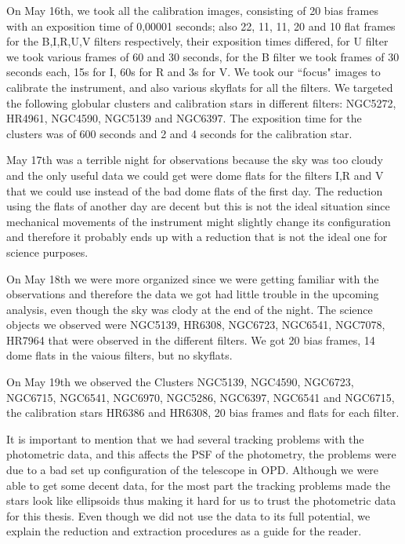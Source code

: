 On May 16th, we took all the calibration images, consisting of 20 bias frames with an exposition time of 0,00001 seconds; also 22, 11, 11, 20 and 10 flat frames for the B,I,R,U,V filters respectively, their exposition times differed, for  U filter we took various frames of 60 and 30 seconds, for the B filter we took frames of 30 seconds each, 15s for I, 60s for R and 3s for V. We took our ``focus" images to calibrate the instrument, and also various skyflats for all the filters. We targeted the following globular clusters and calibration stars in different filters: NGC5272, HR4961, NGC4590, NGC5139 and NGC6397. The exposition time for the clusters was of 600 seconds and 2 and 4 seconds for the calibration star. 

May 17th was a terrible night for observations because the sky was too cloudy and the only useful data we could get were dome flats for the filters I,R and V that we could use instead of the bad dome flats of the first day. The reduction using the flats of another day are decent but this is not the ideal situation since mechanical movements of the instrument might slightly change its configuration and therefore it probably ends up with a reduction that is not the ideal one for science purposes.  

On May 18th we were more organized since we were getting familiar with the observations and therefore the data we got had little trouble in the upcoming analysis, even though the sky was clody at the end of the night. The science objects we observed were NGC5139, HR6308, NGC6723, NGC6541, NGC7078, HR7964 that were observed in the different filters. We got 20 bias frames, 14 dome flats in the vaious filters, but no skyflats. 

On May 19th we observed the Clusters NGC5139, NGC4590, NGC6723, NGC6715, NGC6541, NGC6970, NGC5286,    NGC6397, NGC6541 and NGC6715, the calibration stars HR6386 and HR6308, 20 bias frames and flats for each filter.

It is important to mention that we had several tracking problems with the photometric data, and this affects the PSF of the photometry, the problems were due to a bad set up configuration of the telescope in OPD. Although we were able to get some decent data, for the most part the tracking problems made the stars look like ellipsoids thus making it hard for us to trust the photometric data for this thesis. Even though we did not use the data to its full potential, we explain the reduction and extraction procedures as a guide for the reader.


